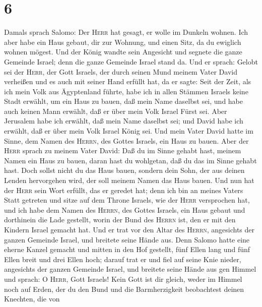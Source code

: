 \hypertarget{section-5}{%
\section{6}\label{section-5}}

 Damals sprach Salomo: Der \textsc{Herr} hat gesagt, er
wolle im Dunkeln wohnen.  Ich aber habe ein Haus gebaut,
dir zur Wohnung, und einen Sitz, da du ewiglich wohnen mögest.
 Und der König wandte sein Angesicht und segnete die ganze
Gemeinde Israel; denn die ganze Gemeinde Israel stand da. 
Und er sprach: Gelobt sei der \textsc{Herr}, der Gott Israels, der durch
seinen Mund meinem Vater David verheißen und es auch mit seiner Hand
erfüllt hat, da er sagte:  Seit der Zeit, als ich mein
Volk aus Ägyptenland führte, habe ich in allen Stämmen Israels keine
Stadt erwählt, um ein Haus zu bauen, daß mein Name daselbst sei, und
habe auch keinen Mann erwählt, daß er über mein Volk Israel Fürst sei.
 Aber Jerusalem habe ich erwählt, daß mein Name daselbst
sei; und David habe ich erwählt, daß er über mein Volk Israel König sei.
 Und mein Vater David hatte im Sinne, dem Namen des
\textsc{Herrn}, des Gottes Israels, ein Haus zu bauen. 
Aber der \textsc{Herr} sprach zu meinem Vater David: Daß du im Sinne
gehabt hast, meinem Namen ein Haus zu bauen, daran hast du wohlgetan,
daß du das im Sinne gehabt hast.  Doch sollst nicht du das
Haus bauen, sondern dein Sohn, der aus deinen Lenden hervorgehen wird,
der soll meinem Namen das Haus bauen.  Und nun hat der
\textsc{Herr} sein Wort erfüllt, das er geredet hat; denn ich bin an
meines Vaters Statt getreten und sitze auf dem Throne Israels, wie der
\textsc{Herr} versprochen hat, und ich habe dem Namen des
\textsc{Herrn}, des Gottes Israels, ein Haus gebaut  und
dorthinein die Lade gestellt, worin der Bund des \textsc{Herrn} ist, den
er mit den Kindern Israel gemacht hat.  Und er trat vor
den Altar des \textsc{Herrn}, angesichts der ganzen Gemeinde Israel, und
breitete seine Hände aus.  Denn Salomo hatte eine eherne
Kanzel gemacht und mitten in den Hof gestellt, fünf Ellen lang und fünf
Ellen breit und drei Ellen hoch; darauf trat er und fiel auf seine Knie
nieder, angesichts der ganzen Gemeinde Israel, und breitete seine Hände
aus gen Himmel  und sprach: O \textsc{Herr}, Gott
Israels! Kein Gott ist dir gleich, weder im Himmel noch auf Erden, der
du den Bund und die Barmherzigkeit beobachtest deinen Knechten, die von
